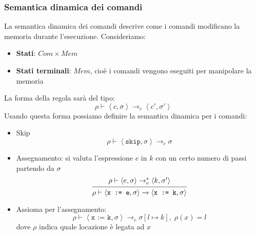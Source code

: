 \documentclass[a4paper]{article}
\begin{document}
\subsubsection{Semantica dinamica dei comandi}
La semantica dinamica dei comandi descrive come i comandi modificano la memoria
durante l'esecuzione. Consideriamo:
\begin{itemize}
\item \textbf{Stati}: \( Com \times Mem \) 
\item \textbf{Stati terminali}: \( Mem \), cioè i comandi vengono eseguiti per
  manipolare la memoria
\end{itemize}
La forma della regola sarà del tipo:
\[
\rho \vdash \left< c, \sigma \right> \to_c \left<c', \sigma' \right>
\] 
Usando questa forma possiamo definire la semantica dinamica per i comandi:
\begin{itemize}
\item Skip
  \[
    \rho \vdash \left< \texttt{skip}, \sigma \right> \to_c \sigma
  \] 

\item Assegnamento: si valuta l'espressione \( e \) in \( k \) con un certo numero
  di passi partendo da \( \sigma \) 
  \[
    \begin{prooftree}
      \hypo{ 
        \rho \vdash \left< e, \sigma \right> \to^*_e \left< k, \sigma' \right>
      }
      \infer1{ 
        \rho \vdash \left< \texttt{x := e}, \sigma  \right>
        \to \left< \texttt{x := k}, \sigma \right>
      }
    \end{prooftree}
  \] 

\item Assioma per l'assegnamento:
  \[
    \rho \vdash \left< \texttt{x := k}, \sigma \right> \to_c
    \sigma[l \mapsto k], \; \rho(x) = l
  \] 
  dove \( \rho \) indica quale locazione è legata ad \( x \)
\end{itemize}
\end{document}
